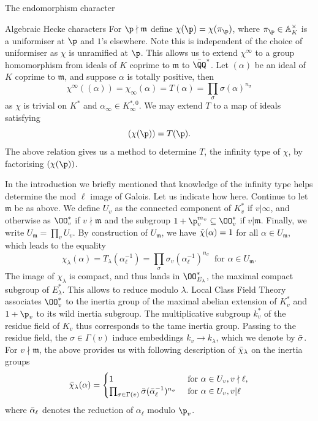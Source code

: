 \documentclass[11pt,a4paper]{article}
\newcommand{\m}{\mathfrak{m}}
\begin{document}
\begin{section}{The endomorphism character}
\begin{subsection}{Algebraic Hecke characters}
For $\p\nmid \mathfrak{m}$ define $\chi(\p)= \chi(\pi_\p)$, where $\pi_\p \in \mathbb{A}_K^\times$ is a uniformiser at $\p$ and $1$'s elsewhere.
Note this is independent of the choice of uniformiser as $\chi$ is unramified at $\p$. This allows us to extend $\chi^\infty$ to a group homomorphism from ideals of $K$ coprime to $\mathfrak{m}$ to $\Bar{\QQ}^*$.
Let $(\alpha)$ be an ideal of $K$ coprime to $\m$, and suppose $\alpha$ is totally positive, then
$$\chi^\infty((\alpha)) = \chi_{\infty}(\alpha) = T(\alpha) = \prod_\sigma \sigma(\alpha)^{n_{\sigma}} $$
as $\chi$ is trivial on $K^*$ and $\alpha_\infty \in K_\infty^{*, 0}$. We may extend $T$ to a map of ideals satisfying $$(\chi(\p)) = T(\p) .$$
The above relation gives us a method to determine $T$, the infinity type of $\chi$, by factorising $(\chi(\p))$.

In the introduction we briefly mentioned that knowledge of the infinity type helps determine the mod $\ell$ image of Galois. Let us indicate how here.
Continue to let $\m$ be as above. We define $U_{v}$ as the connected component of $K^*_v$ if $v|\infty$, and otherwise as $\OO^*_{v}$ if $v \nmid \m$ and  the subgroup $1 + \p_v^{m_v} \subseteq \OO^*_v$ if $v| \m$. Finally, we write $U_\m = \prod_v U_{v}$.
By construction of $U_\m$, we have $\Tilde{\chi}(\alpha)=1$ for all $\alpha \in U_\m$, which leads to the equality 
$$\chi_\lambda(\alpha) = T_\lambda(\alpha_\ell^{-1})=\prod_{\sigma}\sigma_v(\alpha_\ell^{-1})^{n_\sigma} \: \text{ for } \alpha \in U_\m. $$
The image of $\chi_\lambda$ is compact, and thus lands in $\OO_{E_\lambda}^* $, the maximal compact subgroup of $E_\lambda^*$. This allows to reduce modulo $\lambda$.
Local Class Field Theory associates $\OO_v^*$ to the inertia group of the maximal abelian extension of $K_v^*$ and $1+\p_v$ to its wild inertia subgroup.
The multiplicative subgroup $k_v^*$ of the residue field  of $K_v$ thus corresponds to the tame inertia group. Passing to the residue field, the $\sigma \in \Gamma(v)$ induce embeddings $k_v \rightarrow k_\lambda$, which we denote by $\Bar{\sigma}$. For $v \nmid \m$, the above provides us with following description of $\Bar{\chi}_\lambda$ on the inertia groups
\begin{equation*}
\Bar{\chi}_\lambda(\alpha) = 
\begin{cases} 
1 & \text{ for } \alpha \in U_v, v\nmid \ell,\\ 
\prod_{\sigma \in \Gamma(v)} \Bar{\sigma}(\Bar{\alpha}_\ell^{-1})^{n_\sigma}  & \text{ for } \alpha \in U_v, v | \ell
\end{cases}
\end{equation*}
where $\Bar{\alpha}_\ell$ denotes the reduction of $\alpha_\ell$ modulo $\p_v$.


\end{subsection}
\end{section}
\end{document}
